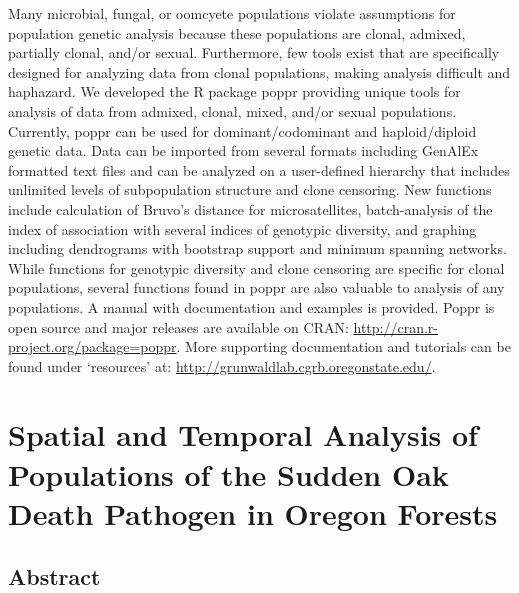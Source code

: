 \documentclass[double,12pt]{beavtex}
\begin{document}
  Many microbial, fungal, or oomcyete populations violate assumptions for
  population genetic analysis because these populations are clonal,
  admixed, partially clonal, and/or sexual. Furthermore, few tools exist
  that are specifically designed for analyzing data from clonal
  populations, making analysis difficult and haphazard. We developed the R
  package poppr providing unique tools for analysis of data from admixed,
  clonal, mixed, and/or sexual populations. Currently, poppr can be used
  for dominant/codominant and haploid/diploid genetic data. Data can be
  imported from several formats including GenAlEx formatted text files and
  can be analyzed on a user-defined hierarchy that includes unlimited
  levels of subpopulation structure and clone censoring. New functions
  include calculation of Bruvo's distance for microsatellites,
  batch-analysis of the index of association with several indices of
  genotypic diversity, and graphing including dendrograms with bootstrap
  support and minimum spanning networks. While functions for genotypic
  diversity and clone censoring are specific for clonal populations,
  several functions found in poppr are also valuable to analysis of any
  populations. A manual with documentation and examples is provided. Poppr
  is open source and major releases are available on CRAN:
  \url{http://cran.r-project.org/package=poppr}. More supporting
  documentation and tutorials can be found under `resources' at:
  \url{http://grunwaldlab.cgrb.oregonstate.edu/}.
  
  \chapter{Spatial and Temporal Analysis of Populations of the Sudden Oak
  Death Pathogen in Oregon
  Forests}\label{spatial-and-temporal-analysis-of-populations-of-the-sudden-oak-death-pathogen-in-oregon-forests}
  
  \section{Abstract}\label{abstract-1}
  
\end{document}
